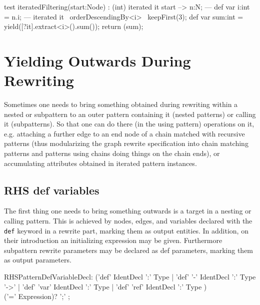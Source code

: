 \begin{example}
  \begin{grgen}
test iteratedFiltering(start:Node) : (int)
{
	iterated it {
		start --> n:N;
	---
		def var i:int = n.i;
	} 
---
	iterated it \ orderDescendingBy<i> \ keepFirst(3);
	def var sum:int = yield([?it].extract<i>().sum());
	return (sum);
}
  \end{grgen}
\end{example}


\pagebreak


\section{Yielding Outwards During Rewriting} \label{sec:localvarorderedevalyield}

Sometimes one needs to bring something obtained during rewriting within a nested or subpattern to an outer pattern containing it (nested patterns) or calling it (subpatterns).
So that one can do there (in the using pattern) operations on it, e.g. attaching a further edge to an end node of a chain matched with recursive patterns (thus modularizing the graph rewrite specification into chain matching patterns and patterns using chains doing things on the chain ends), or accumulating attributes obtained in iterated pattern instances. 

\subsection{RHS def variables} 

The first thing one needs to bring something outwards is a target in a nesting or calling pattern. 
This is achieved by nodes, edges, and variables declared with the \texttt{def} keyword in a rewrite part, marking them as output entities.
In addition, on their introduction an initializing expression may be given.
Furthermore subpattern rewrite parameters may be declared as def parameters,
marking them as output parameters.

\begin{rail} 
  RHSPatternDefVariableDecl: 
	('def' IdentDecl ':' Type |
	'def' '-' IdentDecl ':' Type '->' |
	'def' 'var' IdentDecl ':' Type |
	'def' 'ref' IdentDecl ':' Type ) \\
	('=' Expression)? ';'
	;
\end{rail}

